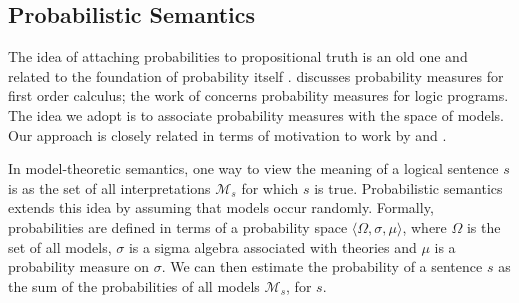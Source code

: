 \documentclass[a4paper,11pt]{article}
\renewcommand{\cite}{\citep}
\newcommand{\newcite}[1]{\citet{#1}}
\theoremstyle{definition}
\begin{document}
\subsection{Probabilistic Semantics}
 
The idea of attaching probabilities to propositional truth is an old one and related to the foundation of probability itself
\cite{Keynes:21,Los:55}. \newcite{Gaifman:64} discusses probability measures for first order calculus; the work of \newcite{Sato:95}
concerns probability measures for logic programs. The idea we adopt is to associate probability measures with the space of models.
Our approach is closely related in terms of motivation to work by \newcite{Cooper:14}
and \newcite{Goodman:14}.





In model-theoretic semantics, one way to
view the meaning of a logical sentence $s$ is as the set of all
interpretations $\mathcal{M}_s$ for which $s$ is true. 
Probabilistic semantics extends this idea by assuming
that models occur randomly.
Formally, probabilities are defined in
terms of a probability space $\langle \Omega, \sigma, \mu\rangle$,
where $\Omega$ is the set of all models, $\sigma$ is a sigma algebra
associated with theories and $\mu$ is a probability measure on
$\sigma$.
We can then estimate the probability of a sentence $s$ as
the sum of the probabilities of all models $\mathcal{M}_s$, for $s$.
\end{document}
